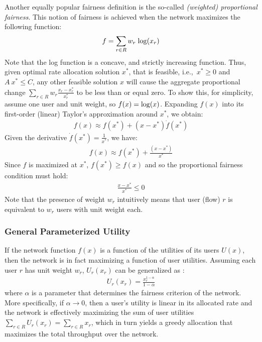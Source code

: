 \documentclass{article}
\def\lg{{\rm log}}
\begin{document}
Another equally popular fairness definition is the so-called {\em (weighted) proportional fairness}. This notion of fairness is achieved when the network maximizes the following function:
\begin{eqnarray*}
f = \sum_{r \in R} w_r \; \lg(x_r)
\label{eq:prop-fair}
\end{eqnarray*}
Note that the log function is a concave, and strictly increasing function. Thus, given optimal rate allocation solution $x^*$, that is feasible, i.e.,\ $x^* \geq 0$ and $A\ x^* \leq C$, any other feasible solution $x$ will cause the aggregate proportional change $\sum_{r \in R} w_r \frac{x_r - x^*_r}{x^*_r}$ to be less than or equal zero.  To show this, for simplicity, assume one user and unit weight, so $f(x) = \lg(x)$. Expanding $f(x)$ into its first-order (linear) Taylor's approximation around $x^*$, we obtain:
\begin{eqnarray*}
f(x) \approx f(x^*) + (x - x^*) \dot{f}(x^*)
\end{eqnarray*}
Given the derivative $\dot{f}(x^*) = \frac{1}{x^*}$, we have:
\begin{eqnarray*}
f(x) \approx f(x^*) + \frac{(x - x^*)}{x^*} 
\end{eqnarray*}
Since $f$ is maximized at $x^*$, $f(x^*) \ge f(x)$ and so the proportional fairness condition must hold: 
\begin{eqnarray*}
\frac{x - x^*}{x^*} \leq 0 
\end{eqnarray*}
Note that the presence of weight $w_r$ intuitively means that user (flow) $r$ is equivalent to $w_r$ users with unit weight each.

\subsubsection{General Parameterized Utility}

If the network function $f(x)$ is a function of the utilities of its users $U(x)$, then the network is in fact maximizing a function of user utilities. Assuming each user $r$ has unit weight $w_r$, $U_r(x_r)$ can be generalized as \cite{Mo:2000}:
\begin{eqnarray*}
U_r(x_r) = \frac{x_r^{1-\alpha}}{1-\alpha}
\end{eqnarray*}
where $\alpha$ is a parameter that determines the fairness criterion of the network. More specifically, if $\alpha \rightarrow 0$, then a user's utility is linear in its allocated rate and the network is effectively maximizing the sum of user utilities $\sum_{r \in R} U_r(x_r) = \sum_{r \in R} x_r$, which in turn yields a greedy allocation that maximizes the total throughput over the network.
\end{document}
